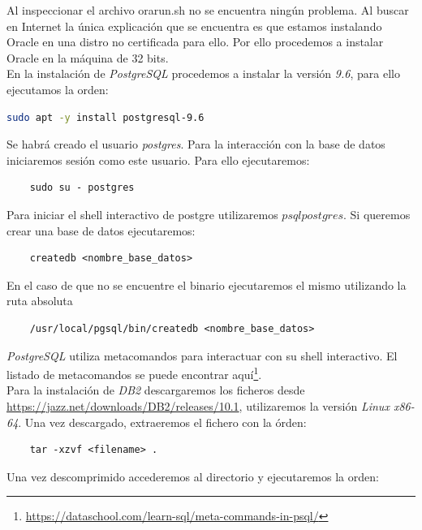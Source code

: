\documentclass{article}
\begin{document}
Al inspeccionar el archivo orarun.sh no se encuentra ningún problema. Al buscar en Internet la única explicación que se encuentra es que estamos instalando
Oracle en una distro no certificada para ello.
Por ello procedemos a instalar Oracle en la máquina de 32 bits.\\

En la instalación de \emph{PostgreSQL} procedemos a instalar la versión \emph{9.6}, para ello ejecutamos la orden: \\

\begin{lstlisting}[language=bash]
    sudo apt -y install postgresql-9.6
\end{lstlisting}

Se habrá creado el usuario \emph{postgres}. Para la interacción con la base de datos iniciaremos sesión como este usuario. Para ello ejecutaremos:

\begin{lstlisting}
    sudo su - postgres
\end{lstlisting}

Para iniciar el shell interactivo de postgre utilizaremos $psql postgres$. Si queremos crear una base de datos ejecutaremos:
\begin{lstlisting}
    createdb <nombre_base_datos>
\end{lstlisting}

En el caso de que no se encuentre el binario ejecutaremos el mismo utilizando la ruta absoluta

\begin{lstlisting}
    /usr/local/pgsql/bin/createdb <nombre_base_datos>
\end{lstlisting}

\emph{PostgreSQL} utiliza metacomandos para interactuar con su shell interactivo. El listado de metacomandos se puede encontrar aquí\footnote{\url{https://dataschool.com/learn-sql/meta-commands-in-psql/}}.\\

Para la instalación de \emph{DB2} descargaremos los ficheros desde \url{https://jazz.net/downloads/DB2/releases/10.1}, utilizaremos la versión \emph{Linux x86-64}. Una vez descargado, extraeremos el fichero con la órden:

\begin{lstlisting}
    tar -xzvf <filename> .
\end{lstlisting}

Una vez descomprimido accederemos al directorio y ejecutaremos la orden:
\end{document}
